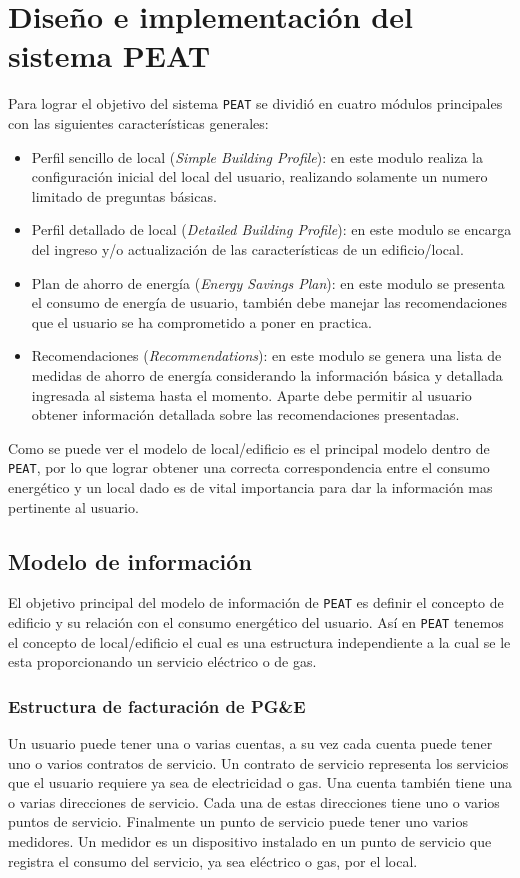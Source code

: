 \chapter{Diseño e implementación del sistema PEAT}

Para lograr el objetivo del sistema \texttt{PEAT} se dividió en cuatro
módulos principales con las siguientes características generales:

\begin{itemize}
\item Perfil sencillo de local (\textit{Simple Building Profile}): en este modulo realiza
  la configuración inicial del local del usuario, realizando solamente un numero limitado
  de preguntas básicas.
\item Perfil detallado de local (\textit{Detailed Building Profile}): en este modulo se
  encarga del ingreso y/o actualización de las características de un edificio/local.
\item Plan de ahorro de energía (\textit{Energy Savings Plan}): en este modulo se
  presenta el consumo de energía de usuario, también debe manejar las recomendaciones
  que el usuario se ha comprometido a poner en practica.
\item Recomendaciones (\textit{Recommendations}): en este modulo se genera una lista
  de medidas de ahorro de energía considerando la información básica y detallada
  ingresada al sistema hasta el momento. Aparte debe permitir al usuario obtener
  información detallada sobre las recomendaciones presentadas.
\end{itemize}

Como se puede ver el modelo de local/edificio es el principal modelo dentro de
\texttt{PEAT}, por lo que lograr obtener una correcta correspondencia entre
el consumo energético y un local dado es de vital importancia para dar la
información mas pertinente al usuario.

\section{Modelo de información}

El objetivo principal del modelo de información de \texttt{PEAT} es definir el
concepto de edificio y su relación con el consumo energético del usuario. Así en
\texttt{PEAT} tenemos el concepto de local/edificio el cual es una estructura
independiente a la cual se le esta proporcionando un servicio eléctrico o de gas.

\subsection{Estructura de facturación de PG\&E}
Un usuario puede tener una o varias cuentas, a su vez cada cuenta puede tener uno o varios
contratos de servicio. Un contrato de servicio representa los servicios que el usuario
requiere ya sea de electricidad o gas. Una cuenta también tiene una o varias direcciones de
servicio.
Cada una de estas direcciones tiene uno o varios puntos de servicio. Finalmente un punto
de servicio puede tener uno varios medidores. Un medidor es un dispositivo instalado en un
punto de servicio que registra el consumo del servicio, ya sea eléctrico o gas, por el local.

